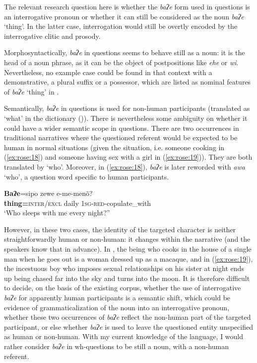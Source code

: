 \documentclass[output=paper]{langscibook}
\begin{document}
The relevant research question here is whether the \textit{baʔe} form used in questions is an interrogative pronoun or whether it can still be considered as the noun \textit{baʔe} ‘thing’. In the latter case, interrogation would still be overtly encoded by the interrogative clitic and prosody.

Morphosyntactically, \textit{baʔe} in questions seems to behave still as a noun: it is the head of a noun phrase, as it can be the object of postpositions like \textit{ehe} or \textit{wi}. Nevertheless, no example case could be found in that context with a demonstrative, a plural suffix or a possessor, which are listed as nominal features of \textit{baʔe} ‘thing’ in . 

Semantically, \textit{baʔe} in questions is used for non-human participants (translated as ‘what’ in the dictionary (\citealt[14]{CachineCachine2020})). There is nevertheless some ambiguity on whether it could have a wider semantic scope in questions. There are two occurrences in traditional narratives where the questioned referent would be expected to be human in normal situations (given the situation, i.e. someone cooking in (\ref{ex:rose:18}) and someone having sex with a girl in (\ref{ex:rose:19})). They are both translated by ‘who’. Moreover, in (\ref{ex:rose:18}), \textit{baʔe} is later reworded with \textit{awa} ‘who’, a question word specific to human participants.

\ea \label{ex:rose:19}
\gll  \textbf{Baʔe}=sipo  zewe  e-me-menõ? \\
\textbf{thing=}\textsc{inter}/\textsc{excl}  daily  1\textsc{sg}{}-\textsc{red}{}-copulate\_with\\
\glt ‘Who sleeps with me every night?” 
\z 

However, in these two cases, the identity of the targeted character is neither straightforwardly human or non-human: it changes within the narrative (and the speakers know that in advance). In , the being who cooks in the house of a single man when he goes out is a woman dressed up as a macaque, and in (\ref{ex:rose:19}), the incestuous boy who imposes sexual relationships on his sister at night ends up being chased far into the sky and turns into the moon. It is therefore difficult to decide, on the basis of the existing corpus, whether the use of interrogative \textit{baʔe} for apparently human participants is a semantic shift, which could be evidence of grammaticalization of the noun into an interrogative pronoun, whether these two occurrences of \textit{baʔe} reflect the non-human part of the targeted participant, or else whether \textit{baʔe} is used to leave the questioned entity unspecified as human or non-human. With my current knowledge of the language, I would rather consider \textit{baʔe} in wh-questions to be still a noun, with a non-human referent.
\end{document}
